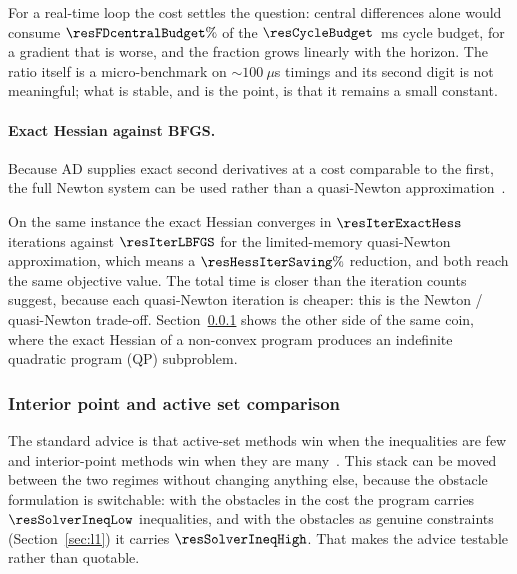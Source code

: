 \documentclass[11pt,a4paper]{article}
\begin{document}
For a real-time loop the cost settles the question: central differences alone would consume
$\resFDcentralBudget\%$ of the $\resCycleBudget$~ms cycle budget, for a gradient that is worse, and the
fraction grows linearly with the horizon. The ratio itself is a micro-benchmark on
$\sim\!100~\mu$s timings and its second digit is not meaningful; what is stable, and is the point, is that it
remains a small constant.

\paragraph{Exact Hessian against BFGS.} Because AD supplies exact second derivatives at a cost
comparable to the first, the full Newton system can be used rather than a quasi-Newton approximation~\cite{nocedal2006numopt}.

\begin{table}[htbp]
  \centering
  \small
  \caption{%
  Interior-point iterations with the exact Hessian and with the limited-memory quasi-Newton approximation (L-BFGS),
  on the same instance. Bold: the lower iteration count.}
  \label{res:tab:hess}
\end{table}

On the same instance the exact Hessian converges in $\resIterExactHess$ iterations against $\resIterLBFGS$
for the limited-memory quasi-Newton approximation, which means a $\resHessIterSaving\%$ reduction, and both reach
the same objective value. The total time is closer than the iteration counts suggest, because each
quasi-Newton iteration is cheaper: this is the Newton / quasi-Newton trade-off. Section~\ref{sec:solvercmp} shows the other side of the same coin, where
the exact Hessian of a non-convex program produces an indefinite quadratic
program (QP) subproblem.

\subsubsection{Interior point and active set comparison}
\label{sec:solvercmp}

The standard advice is that active-set methods win when the inequalities are few and interior-point methods
win when they are many~\cite{nocedal2006numopt,fagiano2025noc}. This stack can be moved between the two regimes without changing anything else,
because the obstacle formulation is switchable: with the obstacles in the cost the program carries
$\resSolverIneqLow$ inequalities, and with the obstacles as genuine constraints (Section~\ref{sec:l1}) it
carries $\resSolverIneqHigh$. That makes the advice testable rather than quotable.
\end{document}
